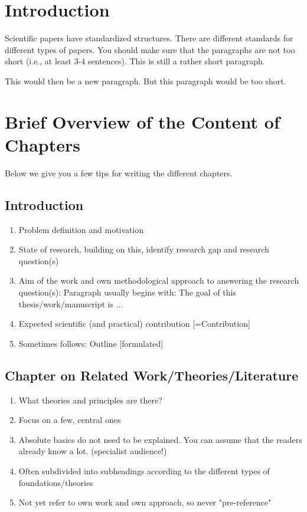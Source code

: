 

\section{Introduction} \label{chap:introduction}
Scientific papers have standardized structures. There are different standards for different types of papers. You should make sure that the paragraphs are not too short (i.e., at least 3-4 sentences). This is still a rather short paragraph.

\noident This would then be a new paragraph. But this paragraph would be too short.


\section{Brief Overview of the Content of Chapters}
Below we give you a few tips for writing the different chapters.


\subsection{Introduction}
\begin{enumerate}
    \item Problem definition and motivation
    \item State of research, building on this, identify research gap and research question(s)
    \item Aim of the work and own methodological approach to answering the research question(s): Paragraph usually begins with: The goal of this thesis/work/manuscript is ...
    \item Expected scientific (and practical) contribution [=Contribution]
    \item Sometimes follows: Outline [formulated]
\end{enumerate}


\subsection{Chapter on Related Work/Theories/Literature}
\begin{enumerate}
    \item What theories and principles are there?
    \item Focus on a few, central ones
    \item Absolute basics do not need to be explained. You can assume that the readers already know a lot. (specialist audience!)
    \item Often subdivided into subheadings according to the different types of foundations/theories
    \item Not yet refer to own work and own approach, so never "pre-reference"
\end{enumerate}

